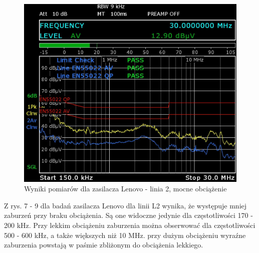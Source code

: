 \documentclass[12pt, a4paper, oneside]{article}
\begin{document}
\begin{figure}[h!]
\centering
\caption{Wyniki pomiarów dla zasilacza Lenovo - linia 2, mocne obciążenie}
\includegraphics[scale=0.34]{Linia2/k3.png}
\end{figure}
Z rys. 7 - 9 dla badań zasilacza Lenovo dla linii L2 wynika, że występuje mniej zaburzeń przy braku obciążenia. Są one widoczne jedynie dla częstotliwości 170 - 200 kHz. Przy lekkim obciążeniu zaburzenia można obserwować dla częstotliwości 500 - 600 kHz, a także większych niż 10 MHz. przy dużym obciążeniu wyraźne zaburzenia powstają w paśmie zbliżonym do obciążenia lekkiego.
\clearpage
\end{document}
